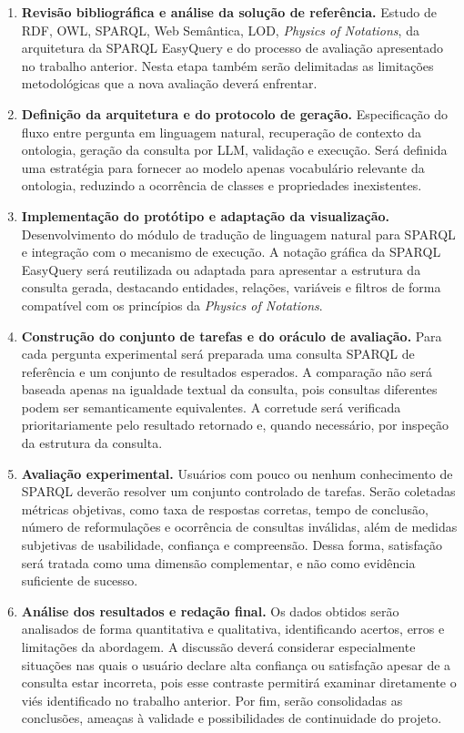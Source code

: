 \documentclass[10pt,a4paper]{article}
\begin{document}
\begin{enumerate}
    \item \textbf{Revisão bibliográfica e análise da solução de referência.} Estudo de RDF, OWL, SPARQL, Web Semântica, LOD, \textit{Physics of Notations}, da arquitetura da SPARQL EasyQuery e do processo de avaliação apresentado no trabalho anterior. Nesta etapa também serão delimitadas as limitações metodológicas que a nova avaliação deverá enfrentar.

    \item \textbf{Definição da arquitetura e do protocolo de geração.} Especificação do fluxo entre pergunta em linguagem natural, recuperação de contexto da ontologia, geração da consulta por LLM, validação e execução. Será definida uma estratégia para fornecer ao modelo apenas vocabulário relevante da ontologia, reduzindo a ocorrência de classes e propriedades inexistentes.

    \item \textbf{Implementação do protótipo e adaptação da visualização.} Desenvolvimento do módulo de tradução de linguagem natural para SPARQL e integração com o mecanismo de execução. A notação gráfica da SPARQL EasyQuery será reutilizada ou adaptada para apresentar a estrutura da consulta gerada, destacando entidades, relações, variáveis e filtros de forma compatível com os princípios da \textit{Physics of Notations}.

    \item \textbf{Construção do conjunto de tarefas e do oráculo de avaliação.} Para cada pergunta experimental será preparada uma consulta SPARQL de referência e um conjunto de resultados esperados. A comparação não será baseada apenas na igualdade textual da consulta, pois consultas diferentes podem ser semanticamente equivalentes. A corretude será verificada prioritariamente pelo resultado retornado e, quando necessário, por inspeção da estrutura da consulta.

    \item \textbf{Avaliação experimental.} Usuários com pouco ou nenhum conhecimento de SPARQL deverão resolver um conjunto controlado de tarefas. Serão coletadas métricas objetivas, como taxa de respostas corretas, tempo de conclusão, número de reformulações e ocorrência de consultas inválidas, além de medidas subjetivas de usabilidade, confiança e compreensão. Dessa forma, satisfação será tratada como uma dimensão complementar, e não como evidência suficiente de sucesso.

    \item \textbf{Análise dos resultados e redação final.} Os dados obtidos serão analisados de forma quantitativa e qualitativa, identificando acertos, erros e limitações da abordagem. A discussão deverá considerar especialmente situações nas quais o usuário declare alta confiança ou satisfação apesar de a consulta estar incorreta, pois esse contraste permitirá examinar diretamente o viés identificado no trabalho anterior. Por fim, serão consolidadas as conclusões, ameaças à validade e possibilidades de continuidade do projeto.
\end{enumerate}
\end{document}
